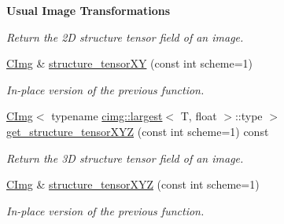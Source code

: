 \begin{Indent}{\bf Usual Image Transformations}
\begin{DoxyCompactItemize}
\begin{DoxyCompactList}\small\item\em Return the 2D structure tensor field of an image. \item\end{DoxyCompactList}\item 
\hypertarget{structcimg__library_1_1_c_img_a95bf97089ffefc83f1d36c2279fd0ff8}{
\hyperlink{structcimg__library_1_1_c_img}{CImg} \& \hyperlink{structcimg__library_1_1_c_img_a95bf97089ffefc83f1d36c2279fd0ff8}{structure\_\-tensorXY} (const int scheme=1)}
\label{structcimg__library_1_1_c_img_a95bf97089ffefc83f1d36c2279fd0ff8}

\begin{DoxyCompactList}\small\item\em In-\/place version of the previous function. \item\end{DoxyCompactList}\item 
\hypertarget{structcimg__library_1_1_c_img_adab3a45db64fc386a05639e6ff81d102}{
\hyperlink{structcimg__library_1_1_c_img}{CImg}$<$ typename \hyperlink{structcimg__library_1_1cimg_1_1largest}{cimg::largest}$<$ T, float $>$::type $>$ \hyperlink{structcimg__library_1_1_c_img_adab3a45db64fc386a05639e6ff81d102}{get\_\-structure\_\-tensorXYZ} (const int scheme=1) const }
\label{structcimg__library_1_1_c_img_adab3a45db64fc386a05639e6ff81d102}

\begin{DoxyCompactList}\small\item\em Return the 3D structure tensor field of an image. \item\end{DoxyCompactList}\item 
\hypertarget{structcimg__library_1_1_c_img_adb7eeb782112814c00bf84b7fa396a42}{
\hyperlink{structcimg__library_1_1_c_img}{CImg} \& \hyperlink{structcimg__library_1_1_c_img_adb7eeb782112814c00bf84b7fa396a42}{structure\_\-tensorXYZ} (const int scheme=1)}
\label{structcimg__library_1_1_c_img_adb7eeb782112814c00bf84b7fa396a42}

\begin{DoxyCompactList}\small\item\em In-\/place version of the previous function. \item\end{DoxyCompactList}\end{DoxyCompactItemize}
\end{Indent}
